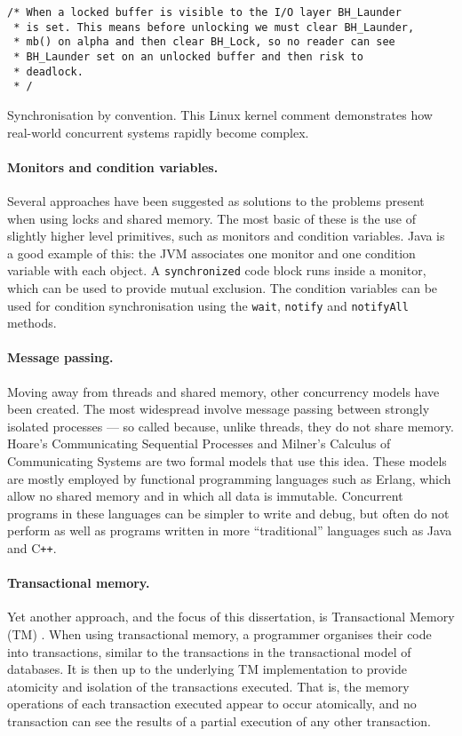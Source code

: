 \documentclass[12pt,a4paper,oneside,openright]{report}
\newcommand{\mycaption}[2]{\caption[#1]{#1 #2}}
\newcommand{\javaKeyword}[1]{\texttt{#1}}
\newcommand{\javaMethod}[1]{\texttt{#1}}
\begin{document}
\begin{Listing}[hbtp]
\begin{lstlisting}
/* When a locked buffer is visible to the I/O layer BH_Launder
 * is set. This means before unlocking we must clear BH_Launder,
 * mb() on alpha and then clear BH_Lock, so no reader can see
 * BH_Launder set on an unlocked buffer and then risk to
 * deadlock.
 * /
\end{lstlisting}

  \mycaption{Synchronisation by convention.}{This Linux kernel comment
    demonstrates how real-world concurrent systems rapidly become
    complex.}
  \label{lst:syncConv}
\end{Listing}


\paragraph{Monitors and condition variables.} Several approaches have
been suggested as solutions to the problems present when using locks
and shared memory. The most basic of these is the use of slightly
higher level primitives, such as monitors and condition
variables. Java is a good example of this: the JVM associates one
monitor and one condition variable with each object. A
\javaKeyword{synchronized} code block runs inside a monitor, which can
be used to provide mutual exclusion. The condition variables can be
used for condition synchronisation using the \javaMethod{wait},
\javaMethod{notify} and \javaMethod{notifyAll} methods.

\paragraph{Message passing.} Moving away from threads and shared
memory, other concurrency models have been created. The most
widespread involve message passing between strongly isolated processes
--- so called because, unlike threads, they do not share
memory. Hoare's Communicating Sequential Processes \cite{CSP} and
Milner's Calculus of Communicating Systems \cite{CCS} are two formal
models that use this idea. These models are mostly employed by
functional programming languages such as Erlang, which allow no shared
memory and in which all data is immutable. Concurrent programs in
these languages can be simpler to write and debug, but often do not
perform as well as programs written in more ``traditional'' languages
such as Java and C\texttt{++}.

\paragraph{Transactional memory.} Yet another approach, and the focus
of this dissertation, is Transactional Memory (TM) \cite{TMBook}. When
using transactional memory, a programmer organises their code into
transactions, similar to the transactions in the transactional model
of databases. It is then up to the underlying TM implementation to
provide atomicity and isolation of the transactions executed. That is,
the memory operations of each transaction executed appear to occur
atomically, and no transaction can see the results of a partial
execution of any other transaction.
\end{document}
